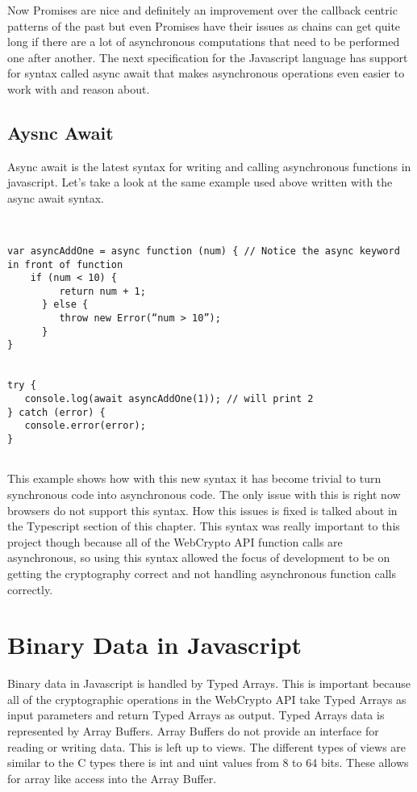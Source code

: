 Now Promises are nice and definitely an improvement over the callback centric patterns of the past but even Promises have their issues as chains can get quite long if there are a lot of asynchronous computations that need to be performed one after another. The next specification for the Javascript language has support for syntax called async await that makes asynchronous operations even easier to work with and reason about.


\subsection{Aysnc Await}


Async await is the latest syntax for writing and calling asynchronous functions in javascript. Let's take a look at the same example used above written with the async await syntax. \cite{js-asyncawait}


\begin{lstlisting}


var asyncAddOne = async function (num) { // Notice the async keyword in front of function
    if (num < 10) {
         return num + 1;
      } else {
         throw new Error(“num > 10”);
      }   
}   


try {
   console.log(await asyncAddOne(1)); // will print 2
} catch (error) {
   console.error(error);
}


\end{lstlisting}


This example shows how with this new syntax it has become trivial to turn synchronous code into asynchronous code. The only issue with this is right now browsers do not support this syntax. How this issues is fixed is talked about in the Typescript section of this chapter. This syntax was really important to this project though because all of the WebCrypto API function calls are asynchronous, so using this syntax allowed the focus of development to be on getting the cryptography correct and not handling asynchronous function calls correctly.


\section{Binary Data in Javascript}


Binary data in Javascript is handled by Typed Arrays. This is important because all of the cryptographic operations in the WebCrypto API take Typed Arrays as input parameters and return Typed Arrays as output. Typed Arrays data is represented by Array Buffers. Array Buffers do not provide an interface for reading or writing data. This is left up to views. The different types of views are similar to the C types there is int and uint values from 8 to 64 bits. These allows for array like access into the Array Buffer. \cite{mdn-typedarrays}




